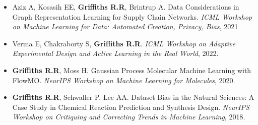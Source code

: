 \documentclass[11pt]{article}
\begin{document}


\begin{itemize}

\item Aziz A, Kosasih EE, \textbf{Griffiths R.R}, Brintrup A. Data Considerations in Graph Representation Learning for Supply Chain Networks. \textit{ICML Workshop on Machine Learning for Data: Automated Creation, Privacy, Bias}, 2021 

\end{itemize}
 


\begin{itemize}

\item Verma E, Chakraborty S, \textbf{Griffiths R.R}. \textit{ICML Workshop on Adaptive Experimental Design and Active Learning in the Real World}, 2022.

\end{itemize}
 


\begin{itemize}

\item \textbf{Griffiths R.R}, Moss H. Gaussian Process Molecular Machine Learning with FlowMO. \textit{NeurIPS Workshop on Machine Learning for Molecules}, 2020.

\end{itemize}
 


\begin{itemize}

\item \textbf{Griffiths R.R}, Schwaller P, Lee AA. Dataset Bias in the Natural Sciences: A Case Study in Chemical Reaction Prediction and Synthesis Design. \textit{NeurIPS Workshop on Critiquing and Correcting Trends in Machine Learning}, 2018.

\end{itemize}
 
\end{document}
